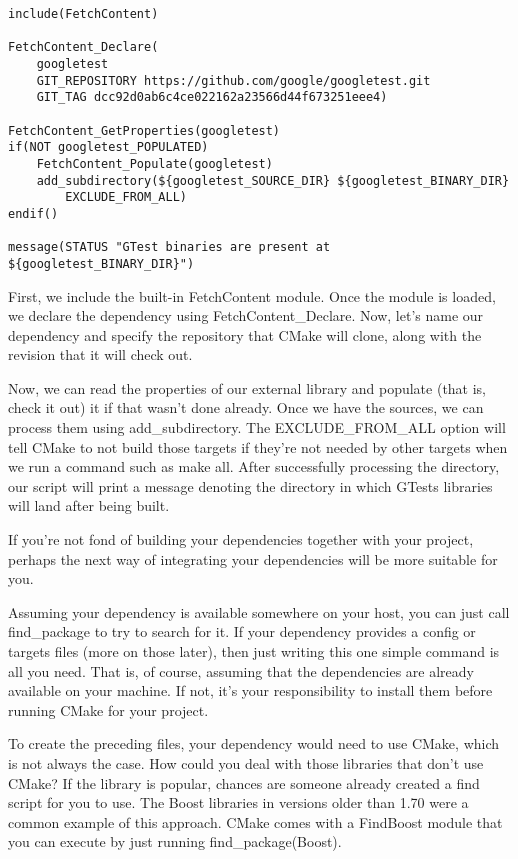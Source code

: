 \begin{lstlisting}[style=styleCMake]
include(FetchContent)

FetchContent_Declare(
	googletest
	GIT_REPOSITORY https://github.com/google/googletest.git
	GIT_TAG dcc92d0ab6c4ce022162a23566d44f673251eee4)

FetchContent_GetProperties(googletest)
if(NOT googletest_POPULATED)
	FetchContent_Populate(googletest)
	add_subdirectory(${googletest_SOURCE_DIR} ${googletest_BINARY_DIR}
		EXCLUDE_FROM_ALL)
endif()

message(STATUS "GTest binaries are present at ${googletest_BINARY_DIR}")
\end{lstlisting}

First, we include the built-in FetchContent module. Once the module is loaded, we declare the dependency using FetchContent\_Declare. Now, let's name our dependency and specify the repository that CMake will clone, along with the revision that it will check out.

Now, we can read the properties of our external library and populate (that is, check it out) it if that wasn't done already. Once we have the sources, we can process them using add\_subdirectory. The EXCLUDE\_FROM\_ALL option will tell CMake to not build those targets if they're not needed by other targets when we run a command such as make all. After successfully processing the directory, our script will print a message denoting the directory in which GTests libraries will land after being built.

If you're not fond of building your dependencies together with your project, perhaps the next way of integrating your dependencies will be more suitable for you.


Assuming your dependency is available somewhere on your host, you can just call find\_package to try to search for it. If your dependency provides a config or targets files (more on those later), then just writing this one simple command is all you need. That is, of course, assuming that the dependencies are already available on your machine. If not, it's your responsibility to install them before running CMake for your project.

To create the preceding files, your dependency would need to use CMake, which is not always the case. How could you deal with those libraries that don't use CMake? If the library is popular, chances are someone already created a find script for you to use. The Boost libraries in versions older than 1.70 were a common example of this approach. CMake comes with a FindBoost module that you can execute by just running find\_package(Boost).

